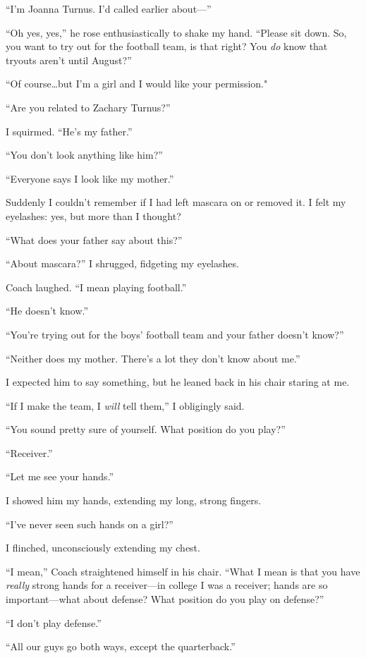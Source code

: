 ``I'm Joanna Turnus. I'd called earlier about---''

``Oh yes, yes,'' he rose enthusiastically to shake my hand. ``Please sit
down. So, you want to try out for the football team, is that right? You
\emph{do} know that tryouts aren't until August?''

``Of course\ldots but I'm a girl and I would like your permission."

``Are you related to Zachary Turnus?''

I squirmed. ``He's my father.''

``You don't look anything like him?''

``Everyone says I look like my mother.''

Suddenly I couldn't remember if I had left mascara on or removed it. I
felt my eyelashes: yes, but more than I thought?

``What does your father say about this?''

``About mascara?'' I shrugged, fidgeting my eyelashes.

Coach laughed. ``I mean playing football.''

``He doesn't know.''

``You're trying out for the boys' football team and your father doesn't
know?''

``Neither does my mother. There's a lot they don't know about me.''

I expected him to say something, but he leaned back in his chair staring
at me.

``If I make the team, I \emph{will} tell them,'' I obligingly said.

``You sound pretty sure of yourself. What position do you play?''

``Receiver.''

``Let me see your hands.''

I showed him my hands, extending my long, strong fingers.

``I've never seen such hands on a girl?''

I flinched, unconsciously extending my chest.

``I mean,'' Coach straightened himself in his chair. ``What I mean is
that you have \emph{really} strong hands for a receiver---in college I
was a receiver; hands are so important---what about defense? What
position do you play on defense?''

``I don't play defense.''

``All our guys go both ways, except the quarterback.''

